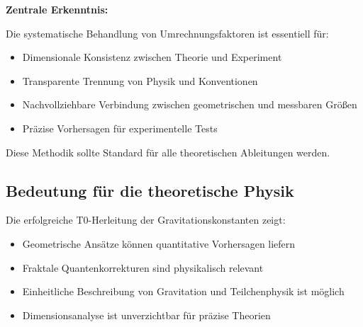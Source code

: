 	\begin{keyresult}
		\textbf{Zentrale Erkenntnis:}
		
		Die systematische Behandlung von Umrechnungsfaktoren ist essentiell für:
		\begin{itemize}
			\item Dimensionale Konsistenz zwischen Theorie und Experiment
			\item Transparente Trennung von Physik und Konventionen
			\item Nachvollziehbare Verbindung zwischen geometrischen und messbaren Größen
			\item Präzise Vorhersagen für experimentelle Tests
		\end{itemize}
		
		Diese Methodik sollte Standard für alle theoretischen Ableitungen werden.
	\end{keyresult}
	
	\subsection{Bedeutung für die theoretische Physik}
	
	Die erfolgreiche T0-Herleitung der Gravitationskonstanten zeigt:
	\begin{itemize}
		\item Geometrische Ansätze können quantitative Vorhersagen liefern
		\item Fraktale Quantenkorrekturen sind physikalisch relevant
		\item Einheitliche Beschreibung von Gravitation und Teilchenphysik ist möglich
		\item Dimensionsanalyse ist unverzichtbar für präzise Theorien
	\end{itemize}
	